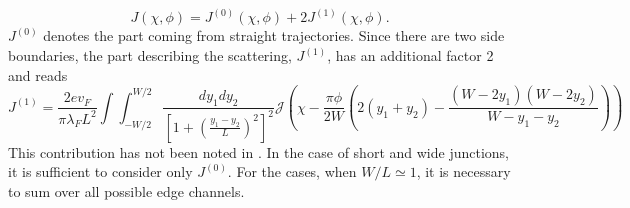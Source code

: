 \begin{equation}
J \left( \chi, \phi \right) = J^{(0)} \left( \chi, \phi \right)  + 2 J^{(1)} \left( \chi, \phi \right).
\end{equation}
$J^{(0)}$ denotes the part coming from straight trajectories. Since there are two side boundaries, the part describing the scattering, $J^{(1)}$, has an additional factor 2 and reads
\begin{equation}
J^{(1)} = \frac{2 e v_F}{\pi \lambda_F L^2} \int \int_{-W/2}^{W/2} \frac{d y_1 d y_2}{ \left[ 1 + \left(\frac{y_1 - y_2}{L}\right)^2\right]^{2}} \mathcal{J} \left( \chi - \frac{\pi \phi}{2 W} \left( 2 (y_1 + y_2) - \frac{(W-2y_1)(W-2y_2)}{W - y_1 - y_2} \right)\right)
\end{equation}
This contribution has not been noted in \cite{Meier2016}. In the case of short and wide junctions, it is sufficient to consider only $J^{(0)}$. For the cases, when $W / L \simeq 1$, it is necessary to sum over all possible edge channels.


